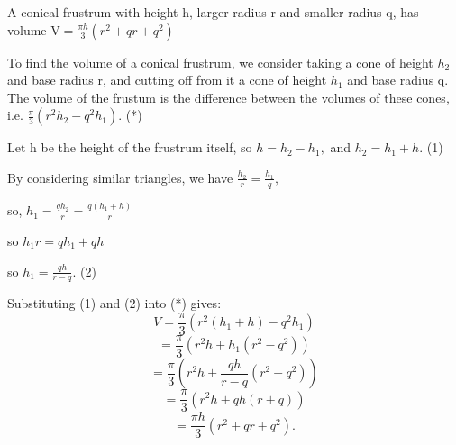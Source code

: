 A conical frustrum with height h, larger radius r and smaller radius q,
has volume $ \mathrm{V} = \frac{\pi h}{3} ( r^2  + qr + q^2 ) $

\par
To find the volume of a conical frustrum, we consider taking a cone of
height $h_{2}$  and base radius r, and cutting off from it a cone of
height $h_{1}$  and base radius q. The volume of the frustum is the
difference between the volumes of these cones, i.e. 
$ \frac{\pi}{3} ( r^2 h_2 - q^2 h_1 ) . $ (*)
\par
Let h be the height of the frustrum itself, so $ h = h_2 - h_1 , $ and 
$ h_2 = h_1 + h . $ (1)
\par
By considering similar triangles, we have $ \frac{h_2}{r} = \frac{h_1}{q} , $
\par
so, $ h_1 = \frac{qh_2}{r} = \frac{q(h_1+h)}{r} $
\par
so $ h_1 r = q h_1 + q h $
\par
 so $ h_1 = \frac{qh}{r-q} . $ (2)
\par
Substituting (1) and (2) into (*) gives:
\[ V = \frac{\pi}{3} ( r^2 ( h_1 + h ) - q^2 h_1 ) \]
\[ = \frac{\pi}{3} ( r^2 h + h_1 ( r^2 - q^2 ) ) \]
\[ = \frac{\pi}{3} ( r^2 h + \frac{qh}{r-q} ( r^2 - q^2 ) ) \]
\[ = \frac{\pi}{3} ( r^2 h + qh ( r + q ) ) \]
\[ = \frac{\pi h }{3} ( r^2  + qr + q^2 ) . \]
